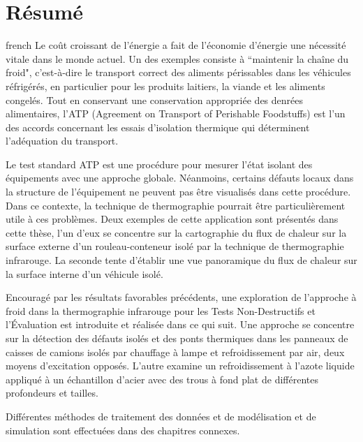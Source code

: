\chapter*{Résumé}                      %

\begin{otherlanguage*}{french}
  Le coût croissant de l'énergie a fait de l'économie d'énergie une nécessité vitale dans le monde actuel. Un des exemples consiste à ``maintenir la chaîne du froid", c'est-à-dire le transport correct des aliments périssables dans les véhicules réfrigérés, en particulier pour les produits laitiers, la viande et les aliments congelés. Tout en conservant une conservation appropriée des denrées alimentaires, l'ATP (Agreement on Transport of Perishable Foodstuffs) est l'un des accords concernant les essais d'isolation thermique qui déterminent l'adéquation du transport.
  
  Le test standard ATP est une procédure pour mesurer l'état isolant des équipements avec une approche globale. Néanmoins, certains défauts locaux dans la structure de l'équipement ne peuvent pas être visualisés dans cette procédure. Dans ce contexte, la technique de thermographie pourrait être particulièrement utile à ces problèmes. Deux exemples de cette application sont présentés dans cette thèse, l'un d'eux se concentre sur la cartographie du flux de chaleur sur la surface externe d'un rouleau-conteneur isolé par la technique de thermographie infrarouge. La seconde tente d'établir une vue panoramique du flux de chaleur sur la surface interne d'un véhicule isolé.
  
  Encouragé par les résultats favorables précédents, une exploration de l'approche à froid dans la thermographie infrarouge pour les Tests Non-Destructifs et l'Évaluation est introduite et réalisée dans ce qui suit. Une approche se concentre sur la détection des défauts isolés et des ponts thermiques dans les panneaux de caisses de camions isolés par chauffage à lampe et refroidissement par air, deux moyens d'excitation opposés. L'autre examine un refroidissement à l'azote liquide appliqué à un échantillon d'acier avec des trous à fond plat de différentes profondeurs et tailles.
  
  Différentes méthodes de traitement des données et de modélisation et de simulation sont effectuées dans des chapitres connexes.
\end{otherlanguage*}
